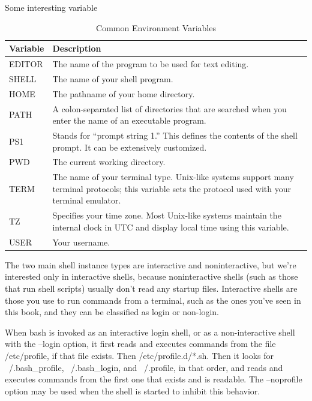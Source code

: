\documentclass[paper=8.5in:11in, twoside, 12pt, pagesize=pdftex]{book}
\begin{document}
	\par Some interesting variable
\begin{table}[h]
\centering
\begin{tabular}{|l|p{10cm}|}
\hline
\textbf{Variable} & \textbf{Description} \\
\hline
EDITOR & The name of the program to be used for text editing. \\
\hline
SHELL & The name of your shell program. \\
\hline
HOME & The pathname of your home directory. \\
\hline
PATH & A colon-separated list of directories that are searched when you enter the name of an executable program. \\
\hline
PS1 & Stands for “prompt string 1.” This defines the contents of the shell prompt. It can be extensively customized. \\
\hline
PWD & The current working directory. \\
\hline
TERM & The name of your terminal type. Unix-like systems support many terminal protocols; this variable sets the protocol used with your terminal emulator. \\
\hline
TZ & Specifies your time zone. Most Unix-like systems maintain the internal clock in UTC and display local time using this variable. \\
\hline
USER & Your username. \\
\hline
\end{tabular}
\caption{Common Environment Variables}
\end{table}

	\par The two main shell instance types are interactive and noninteractive, but we’re interested only in interactive shells, because noninteractive shells (such as those that run shell scripts) usually don’t read any startup files. Interactive shells are those you use to run commands from a terminal, such as the ones you’ve seen in this book, and they can be classified as login or non-login.

	\par When bash is invoked as an interactive login shell, or as a non-interactive shell with the --login option, it first reads and executes commands from the file /etc/profile, if that file exists. Then /etc/profile.d/*.sh. Then it looks for ~/.bash\_profile,  ~/.bash\_login, and ~/.profile, in that order, and reads and executes commands from the first one that exists and is readable. The --noprofile option may be used when the shell is started to inhibit this behavior.
		
\end{document}
